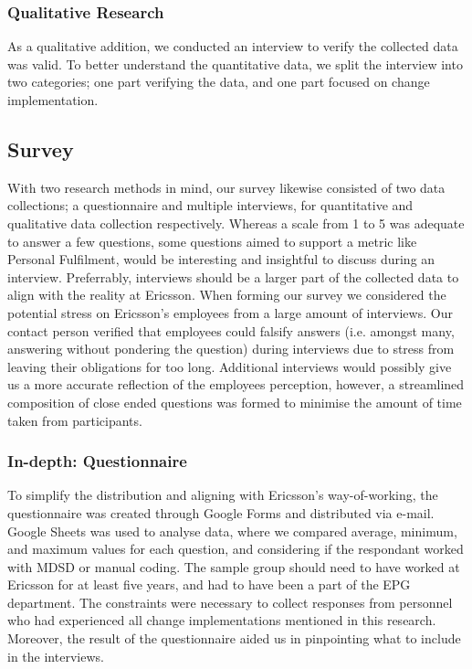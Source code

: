 \documentclass[final_report_innit.tex]{subfiles}
\begin{document}
\subsubsection{Qualitative Research}\label{approachQual}
As a qualitative addition, we conducted an interview to verify the collected data was valid. To better understand the quantitative data, we split the interview into two categories; one part verifying the data, and one part focused on change implementation.

\subsection{Survey}\label{approachSurvey}
With two research methods in mind, our survey likewise consisted of two data collections; a questionnaire and multiple interviews, for quantitative and qualitative data collection respectively. Whereas a scale from 1 to 5 was adequate to answer a few questions, some questions aimed to support a metric like Personal Fulfilment, would be interesting and insightful to discuss during an interview. Preferrably, interviews should be a larger part of the collected data to align with the reality at Ericsson. When forming our survey we considered the potential stress on Ericsson's employees from a large amount of interviews. Our contact person verified that employees could falsify answers (i.e. amongst many, answering without pondering the question) during interviews due to stress from leaving their obligations for too long. Additional interviews would possibly give us a more accurate reflection of the employees perception, however, a streamlined composition of close ended questions was formed to minimise the amount of time taken from participants.
\\
\subsubsection{In-depth: Questionnaire}\label{approachInQuest}
To simplify the distribution and aligning with Ericsson's way-of-working, the questionnaire was created through Google Forms and distributed via e-mail. Google Sheets was used to analyse data, where we compared average, minimum, and maximum values for each question, and considering if the respondant worked with MDSD or manual coding. The sample group should need to have worked at Ericsson for at least five years, and had to have been a part of the EPG department. The constraints were necessary to collect responses from personnel who had experienced all change implementations mentioned in this research. Moreover, the result of the questionnaire aided us in pinpointing what to include in the interviews.
\\
\end{document}
